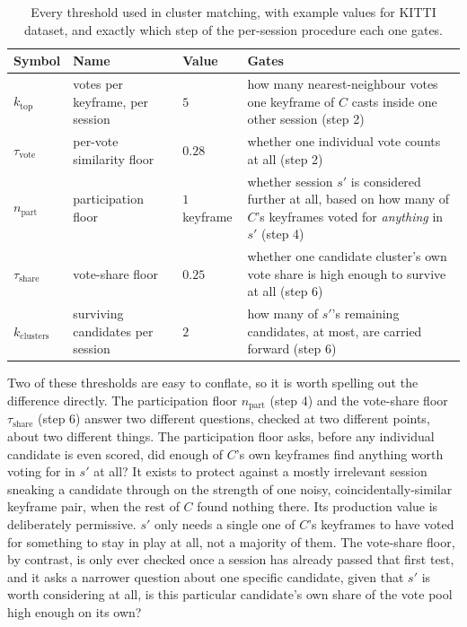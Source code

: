 \begin{table}[htb]
  \centering
  \begin{tabular}{lllp{5.3cm}}
  \hline
  \textbf{Symbol} & \textbf{Name} & \textbf{Value} & \textbf{Gates} \\
  \hline
  $k_{\mathrm{top}}$ & votes per keyframe, per session & $5$ &
    how many nearest-neighbour votes one keyframe of $C$ casts inside one other session
    (step 2) \\
  $\tau_{\mathrm{vote}}$ & per-vote similarity floor & $0.28$ &
    whether one individual vote counts at all (step 2) \\
  $n_{\mathrm{part}}$ & participation floor & $1$ keyframe &
    whether session $s'$ is considered further at all, based on how many of $C$'s keyframes
    voted for \emph{anything} in $s'$ (step 4) \\
  $\tau_{\mathrm{share}}$ & vote-share floor & $0.25$ &
    whether one candidate cluster's own vote share is high enough to survive at all
    (step 6) \\
  $k_{\mathrm{clusters}}$ & surviving candidates per session & $2$ &
    how many of $s'$'s remaining candidates, at most, are carried forward (step 6) \\
  \hline
  \end{tabular}
  \caption[Cluster-matching thresholds]{Every threshold used in cluster matching, with example values for KITTI \cite{geiger2012kitti} dataset, and exactly which step of the per-session procedure each one gates.}
  \label{tab:method-cluster-matching-thresholds}
\end{table}

Two of these thresholds are easy to conflate, so it is worth spelling out the difference
directly. The participation floor $n_{\mathrm{part}}$ (step 4) and the vote-share floor
$\tau_{\mathrm{share}}$ (step 6) answer two different questions, checked at two different
points, about two different things. The participation floor asks, before any individual
candidate is even scored, did enough of $C$'s own keyframes find anything worth voting for in
$s'$ at all? It exists to protect against a mostly irrelevant session sneaking a candidate
through on the strength of one noisy, coincidentally-similar keyframe pair, when the rest of
$C$ found nothing there. Its production value is deliberately permissive. $s'$ only needs a
single one of $C$'s keyframes to have voted for something to stay in play at all, not a
majority of them. The vote-share floor, by contrast, is only ever checked once a session has
already passed that first test, and it asks a narrower question about one specific candidate,
given that $s'$ is worth considering at all, is this particular candidate's own share of the
vote pool high enough on its own?

